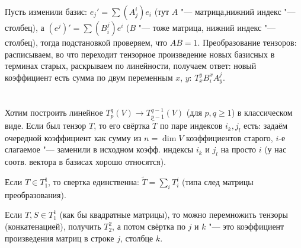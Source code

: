 Пусть изменили базис: $e_j' = \sum(A_j^i)e_i$ (тут $A$ "--- матрица,нижний индекс "--- столбец), а $(e^j)'=\sum (B_i^j) e^i$ ($B$ "--- тоже матрица, нижний индекс "--- столбец),
тогда подстановкой проверяем, что $AB=1$.
Преобразование тензоров: расписываем, во что переходит тензорное произведение новых базисных в терминах старых, раскрываем по линейности,
получаем ответ: новый коэффициент есть сумма по двум переменным $x$, $y$: $T_{x}^y B_{i}^x A_{y}^{j}$.

\section{} %
Хотим построить линейное $T_p^q(V) \to T_{p-1}^{q-1}(V)$ (для $p,q\ge 1$) в классическом виде.
Если был тензор $T$, то его свёртка $\tilde T$ по паре индексов $i_k, j_l$ есть: задаём очередной коэффициент как сумму из $n=\dim V$ коэффициентов старого,
$i$-е слагаемое "--- заменили в исходном коэфф. индексы $i_k$ и $j_l$ на просто $i$ (у нас соотв. вектора в базисах хорошо относятся).

Если $T \in T_1^1$, то свертка единственна: $\tilde T = \sum_i T_i^i$ (типа след матрицы преобразования).

Если $T, S \in T_1^1$ (как бы квадратные матрицы), то можно перемножить тензоры (конкатенацией), получить $T_2^2$, а потом свёртка по $j$ и $k$ "--- это коэффициент
произведения матриц в строке $j$, столбце $k$.
